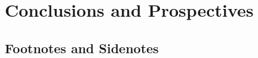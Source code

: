 \documentclass[./dissertation.tex]{subfiles}
\begin{document}
\part{Conclusions and Prospectives}

    \chapter{Footnotes and Sidenotes}
\end{document}
